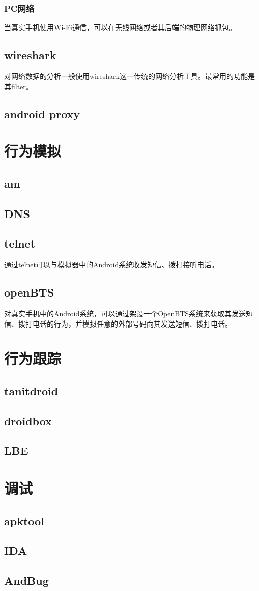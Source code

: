 \subsubsection{PC网络}
当真实手机使用Wi-Fi通信，可以在无线网络或者其后端的物理网络抓包。
\subsection{wireshark}
对网络数据的分析一般使用wireshark这一传统的网络分析工具。最常用的功能是其filter。

\subsection{android proxy}
\section{行为模拟}
\subsection{am}

\subsection{DNS}

\subsection{telnet}
通过telnet可以与模拟器中的Android系统收发短信、拨打接听电话。
\subsection{openBTS}
对真实手机中的Android系统，可以通过架设一个OpenBTS系统来获取其发送短信、拨打电话的行为，并模拟任意的外部号码向其发送短信、拨打电话。

\section{行为跟踪}
\subsection{tanitdroid}
\subsection{droidbox}
\subsection{LBE}

\section{调试}
\label{Sec:debug}
\subsection{apktool}
\subsection{IDA}
\subsection{AndBug}
